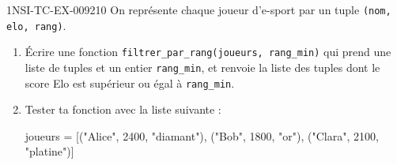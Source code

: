 \begin{exercice}{1NSI-TC-EX-009}{2}{10}
On représente chaque joueur d'e-sport par un tuple \lstinline{(nom, elo, rang)}.

\begin{enumerate}
  \item Écrire une fonction \lstinline{filtrer_par_rang(joueurs, rang_min)} qui prend
        une liste de tuples et un entier \lstinline{rang_min}, et renvoie la liste des
        tuples dont le score Elo est supérieur ou égal à \lstinline{rang_min}.
  \item Tester ta fonction avec la liste suivante :
\begin{python}
joueurs = [("Alice", 2400, "diamant"),
           ("Bob", 1800, "or"),
           ("Clara", 2100, "platine")]
\end{python}
\end{enumerate}
\end{exercice}
